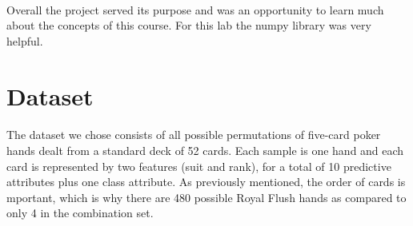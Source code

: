 \documentclass{article}
\begin{document}
\paragraph{} 
Overall the project served its purpose and was an opportunity to learn
much about the concepts of this course. For this lab the 
numpy library was very helpful.
\newpage


\section*{Dataset}
\paragraph{}
The dataset we chose consists of all possible permutations of five-card poker hands dealt
from a standard deck of 52 cards.  Each sample is one hand and each card is represented
by two features (suit and rank), for a total of 10 predictive attributes plus one class
attribute.  As previously mentioned, the order of cards is mportant, which is why there
are 480 possible Royal Flush hands as compared to only 4 in the combination set.
\end{document}

